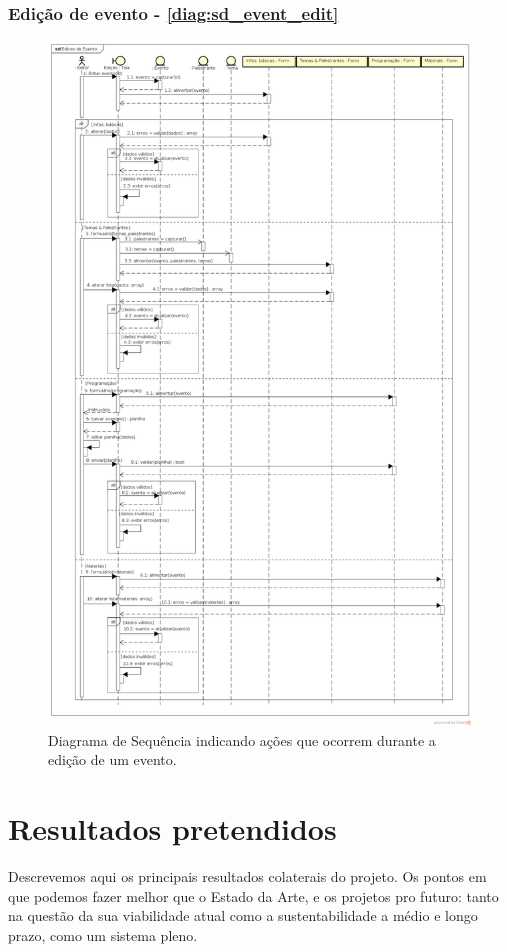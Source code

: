 \documentclass[12pt,a4paper,twoside,hyphens,english,brazil]{abntex2}
\begin{document}
{\subsubsection*{Edição de evento - \autoref{diag:sd_event_edit}}
\begin{figure}[p!] %
	\centering
	\includegraphics[width=0.9\linewidth]{diagramas/comuns/sd_event_edit.png}
	\caption{Diagrama de Sequência indicando ações que ocorrem durante a edição de um evento.}
	\label{diag:sd_event_edit}
\end{figure}



\section{Resultados pretendidos}
Descrevemos aqui os principais resultados colaterais do projeto. Os pontos em que podemos fazer melhor que o Estado da Arte, e os projetos pro futuro: tanto na questão da sua viabilidade atual como a sustentabilidade a médio e longo prazo, como um sistema pleno.

}
\end{document}

